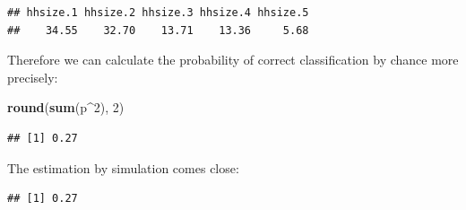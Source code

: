 \documentclass[]{article}
\newenvironment{Shaded}{\begin{snugshade}}{\end{snugshade}}
\newcommand{\ControlFlowTok}[1]{\textcolor[rgb]{0.13,0.29,0.53}{\textbf{#1}}}
\newcommand{\DataTypeTok}[1]{\textcolor[rgb]{0.13,0.29,0.53}{#1}}
\newcommand{\DecValTok}[1]{\textcolor[rgb]{0.00,0.00,0.81}{#1}}
\newcommand{\KeywordTok}[1]{\textcolor[rgb]{0.13,0.29,0.53}{\textbf{#1}}}
\newcommand{\NormalTok}[1]{#1}
\newcommand{\OperatorTok}[1]{\textcolor[rgb]{0.81,0.36,0.00}{\textbf{#1}}}
\newcommand{\OtherTok}[1]{\textcolor[rgb]{0.56,0.35,0.01}{#1}}
\newcommand{\StringTok}[1]{\textcolor[rgb]{0.31,0.60,0.02}{#1}}
\begin{document}
\begin{Shaded}
\end{Shaded}

\begin{verbatim}
## hhsize.1 hhsize.2 hhsize.3 hhsize.4 hhsize.5 
##    34.55    32.70    13.71    13.36     5.68
\end{verbatim}

Therefore we can calculate the probability of correct classification by
chance more precisely:

\begin{Shaded}
\begin{Highlighting}[]
\KeywordTok{round}\NormalTok{(}\KeywordTok{sum}\NormalTok{(p}\OperatorTok{^}\DecValTok{2}\NormalTok{), }\DecValTok{2}\NormalTok{)}
\end{Highlighting}
\end{Shaded}

\begin{verbatim}
## [1] 0.27
\end{verbatim}

The estimation by simulation comes close:

\begin{Shaded}
\end{Shaded}

\begin{verbatim}
## [1] 0.27
\end{verbatim}
\end{document}

